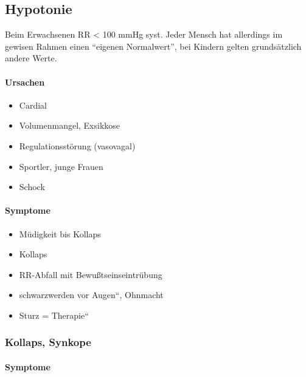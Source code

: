 \subsection{Hypotonie}

 
 Beim Erwachsenen RR {\textless} 100 mmHg
syst. Jeder Mensch hat allerdings im gewisen Rahmen einen
"`eigenen Normalwert"', bei Kindern gelten grundsätzlich
andere Werte.


\paragraph{Ursachen}

\begin{itemize}
    \item Cardial
    \item Volumenmangel, Exsikkose
    \item Regulationsst\"orung (vasovagal)
    \item Sportler, junge Frauen
    \item Schock
\end{itemize}

\paragraph{Symptome}

\begin{itemize}
    \item M\"udigkeit bis Kollaps
    \item Kollaps
    \item RR-Abfall mit Bewu{\ss}tseinseintr\"ubung
    \item {\quotedblbase}schwarzwerden vor Augen{\textquotedblleft}, Ohnmacht
    \item Sturz = {\quotedblbase}Therapie{\textquotedblleft}
\end{itemize}


\subsubsection{Kollaps, Synkope}


\paragraph{Symptome}

